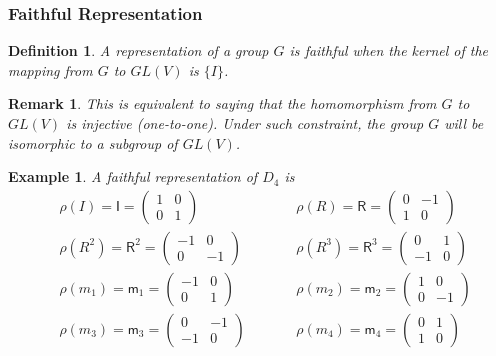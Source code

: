 \documentclass{article}
\theoremstyle{plain}\theoremheaderfont{\normalfont\itshape}\theorembodyfont{\rmfamily}\theoremseparator{.}\newtheorem*{rem}{Remark}\newtheorem*{ex}{Example}\newtheorem*{proof}{Proof}\newtheorem*{altp}{Alternative proof}
\theoremstyle{plain}\theoremheaderfont{\normalfont\bfseries}\theorembodyfont{\rmfamily}\theoremseparator{.}\newtheorem{thm}{Theorem}[section]\newtheorem{lem}[thm]{Lemma}\newtheorem{prop}[thm]{Proposition}\newtheorem*{cor}{Corollary}\newtheorem{defn}[thm]{Definition}\newtheorem{clm}[thm]{Claim}\newtheorem{clminproof}{Claim}
\theoremstyle{break}\theoremheaderfont{\normalfont\itshape}\theorembodyfont{\rmfamily}\theoremseparator{.\medskip}\newtheorem*{proofskip}{Proof}\newtheorem*{exs}{Examples}\newtheorem*{rems}{Remarks}
\theoremstyle{break}\theoremheaderfont{\normalfont\bfseries}\theorembodyfont{\rmfamily}\theoremseparator{.\medskip}\newtheorem{lemskip}[thm]{Lemma}\newtheorem{defnskip}[thm]{Definition}\newtheorem{propskip}[thm]{Proposition}\newtheorem{thmskip}[thm]{Theorem}
\numberwithin{equation}{section}
\begin{document}
	\subsubsection{Faithful Representation}
	\begin{defn}
		A representation of a group \(G\) is \textit{faithful} when the kernel of the mapping from \(G\) to \(GL(V)\) is \(\{I\}\).
	\end{defn}
	\begin{rem}
		This is equivalent to saying that the homomorphism from \(G\) to \(GL(V)\) is injective (one-to-one). Under such constraint, the group \(G\) will be isomorphic to a subgroup of \(GL(V)\).
	\end{rem}
	\begin{ex}
		A faithful representation of \(D_4\) is
		\begin{align*}
			&\rho(I)=\mathsf{I}=\begin{pmatrix}
				1 & 0\\
				0 & 1
			\end{pmatrix}\qquad && \rho(R)=\mathsf{R}=\begin{pmatrix}
				0 & -1\\
				1 & 0
			\end{pmatrix} \\
			&\rho(R^2)=\mathsf{R}^2=\begin{pmatrix}
				-1 & 0\\
				0 & -1
			\end{pmatrix}\qquad	&& \rho(R^3)=\mathsf{R}^3=\begin{pmatrix}
				0 & 1\\
				-1 & 0
			\end{pmatrix} \\
			&\rho(m_1)=\mathsf{m}_1=\begin{pmatrix}
				-1 & 0\\
				0 & 1
			\end{pmatrix}\qquad	&& \rho(m_2)=\mathsf{m}_2=\begin{pmatrix}
				1 & 0\\
				0 & -1
			\end{pmatrix} \\
			&\rho(m_3)=\mathsf{m}_3=\begin{pmatrix}
				0 & -1\\
				-1 & 0
			\end{pmatrix}\qquad && \rho(m_4)=\mathsf{m}_4=\begin{pmatrix}
				0 & 1\\
				1 & 0
			\end{pmatrix}
		\end{align*}
	\end{ex}
\end{document}
